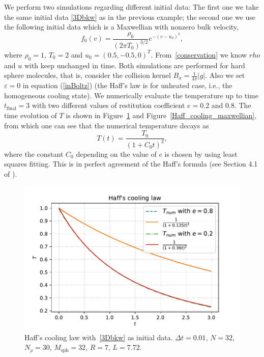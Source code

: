 \documentclass[review,times]{elsarticle}
\begin{document}
{\color{red} We perform two simulations regarding different initial data: The first one we take the same initial data \eqref{3Dbkw} as in the previous example; the second one we use the following initial data which is a Maxwellian with nonzero bulk velocity,
\begin{equation}\label{3D_maxwellian}
  f_0(v) = \frac{\rho_0}{(2\pi T_0)^{3/2}}e^{-(v - u_0)^2},
\end{equation}
where $\rho_0 = 1$, $T_0 = 2$ and $u_0 = (0.5, -0.5, 0)^T$. From~\eqref{conservation} we know $rho$ and $u$ with keep unchanged in time. Both simulations are performed} for hard sphere molecules, that is, consider the collision kernel $B_{\sigma} = \frac{1}{4\pi}|g|$. Also we set $\varepsilon=0$ in equation (\ref{inBoltz}) (the Haff's law is for unheated case, i.e., the homogeneous cooling state). We numerically evaluate the temperature up to time $t_\text{final}=3$ with two different values of restitution coefficient $e=0.2$ and $0.8$. The time evolution of $T$ is shown in Figure~\ref{Haff_cooling} and Figure~\ref{Haff_cooling_maxwellian}, from which one can see that the numerical temperature decays as 
\begin{equation}
T(t) = \frac{T_0}{(1+C_0 t)^2},
\end{equation}
where the constant $C_0$ {\color{red} depending on the value of $e$ is chosen by using least squares fitting}. This is in perfect agreement of the Haff's formula (see Section 4.1 of \cite{NE}).

\begin{figure}[htp!]
  \centering
  \includegraphics[width = .8\linewidth]{Haff's_cooling}
  \caption{Haff's cooling law {\color{red} with~\eqref{3Dbkw} as initial data}. $\Delta t=0.01$, $N=32$, $N_{\rho}=30$, $M_{\text{sph}}=32$, $R=7$, $L=7.72$.}
  \label{Haff_cooling}
\end{figure}
\end{document}
